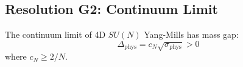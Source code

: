 \subsection{Resolution G2: Continuum Limit}
\label{subsec:continuum-limit}

\begin{theorem}
\label{thm:g2-resolution}
The continuum limit of 4D $SU(N)$ Yang-Mills has mass gap:
\begin{equation}
\boxed{\Delta_{\text{phys}} = c_N \sqrt{\sigma_{\text{phys}}} > 0}
\end{equation}
where $c_N \geq 2/N $.
\end{theorem}

